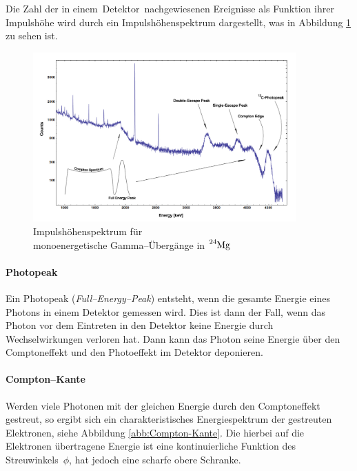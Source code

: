 \documentclass[12pt,a4paper]{scrartcl}
\numberwithin{equation}{section} %
\begin{document}
Die Zahl der in einem~Detektor~nachgewiesenen Ereignisse als Funktion ihrer Impulshöhe wird durch ein Impulshöhenspektrum dargestellt, was in Abbildung \ref{abb:Impulshoehenspektrum} zu sehen ist. \cite{Impulshöhenspektrum}

\begin{figure}[h]
	\centering
	\includegraphics[width=0.9\textwidth]{../media/B3.4/Am_Be_SourceSpectrum.jpg}
	\caption{Impulshöhenspektrum für \\
		monoenergetische Gamma--Übergänge in $\ce{^{24}Mg}$  \cite{abb:Spektrum}}
	\label{abb:Impulshoehenspektrum}
\end{figure}

\paragraph{Photopeak}

Ein Photopeak (\emph{Full--Energy--Peak}) entsteht, wenn die gesamte Energie eines Photons in einem Detektor gemessen wird. Dies ist dann der Fall, wenn das Photon vor dem Eintreten in den Detektor keine Energie durch Wechselwirkungen verloren hat. Dann kann das Photon seine Energie über den Comptoneffekt und den Photoeffekt im Detektor deponieren.

\paragraph{Compton--Kante}

Werden viele Photonen mit der gleichen Energie durch den Comptoneffekt gestreut, so ergibt sich ein charakteristisches Energiespektrum der gestreuten Elektronen, siehe Abbildung \ref{abb:Compton-Kante}. Die hierbei auf die Elektronen übertragene Energie ist eine kontinuierliche Funktion des Streuwinkels~$\phi$, hat jedoch eine scharfe obere Schranke.
\end{document}

